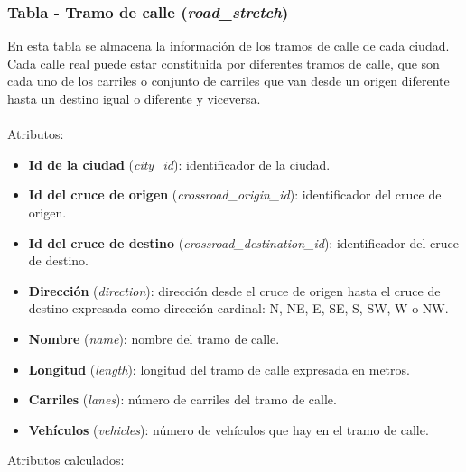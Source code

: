 \subsubsection{Tabla - Tramo de calle (\textit{road\_stretch})}
En esta tabla se almacena la información de los tramos de calle de cada ciudad. Cada calle real puede estar constituida por diferentes tramos de calle, que son cada uno de los carriles o conjunto de carriles que van desde un origen diferente hasta un destino igual o diferente y viceversa. \\\\
Atributos:
\begin{itemize}
    \item \textbf{Id de la ciudad} (\textit{city\_id}): identificador de la ciudad.
    \item \textbf{Id del cruce de origen} (\textit{crossroad\_origin\_id}): identificador del cruce de origen.
    \item \textbf{Id del cruce de destino} (\textit{crossroad\_destination\_id}): identificador del cruce de destino.
    \item \textbf{Dirección} (\textit{direction}): dirección desde el cruce de origen hasta el cruce de destino expresada como dirección cardinal: N, NE, E, SE, S, SW, W o NW.
    \item \textbf{Nombre} (\textit{name}): nombre del tramo de calle.
    \item \textbf{Longitud} (\textit{length}): longitud del tramo de calle expresada en metros.
    \item \textbf{Carriles} (\textit{lanes}): número de carriles del tramo de calle.
    \item \textbf{Vehículos} (\textit{vehicles}): número de vehículos que hay en el tramo de calle.
\end{itemize}
Atributos calculados:
